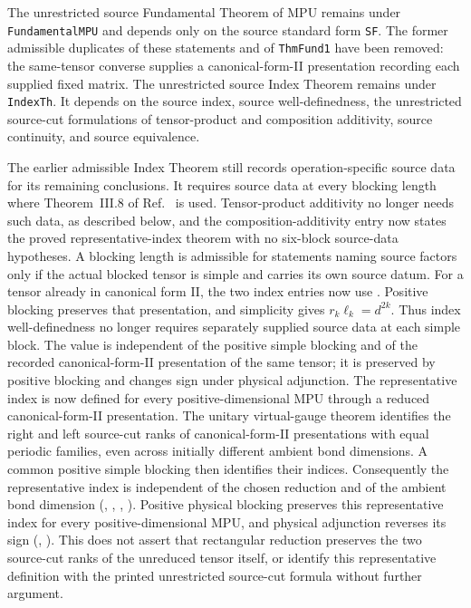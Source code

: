 \documentclass{article}
\begin{document}
The unrestricted source Fundamental Theorem of MPU remains under
\texttt{FundamentalMPU} and depends only on the source standard form
\texttt{SF}. The former admissible duplicates of these statements and of
\texttt{ThmFund1} have been removed: the same-tensor converse supplies a
canonical-form-II presentation recording each supplied fixed matrix.
The unrestricted source Index Theorem remains under
\texttt{IndexTh}. It depends on the source index, source well-definedness,
the unrestricted source-cut formulations of tensor-product and composition
additivity, source continuity, and
source equivalence.

The earlier admissible Index Theorem still records operation-specific source
data for its remaining conclusions. It requires source data at every blocking
length where Theorem~III.8 of Ref.~\cite{Cirac2017MPU} is used. Tensor-product
additivity no longer needs such data, as described below, and the
composition-additivity entry now states the proved representative-index
theorem with no six-block source-data hypotheses. A blocking length is
admissible for statements naming source factors only if the actual blocked
tensor is simple and carries its own source datum.
For a tensor already in canonical form II, the two index entries now use
. Positive blocking preserves
that presentation, and simplicity gives $r_k\ell_k=d^{2k}$. Thus index
well-definedness no longer requires separately supplied source data at each
simple block. The value is independent of the positive simple blocking and
of the recorded canonical-form-II presentation of the same tensor; it is
preserved by positive blocking and changes sign under physical adjunction.
The representative index is now defined for every positive-dimensional MPU
through a reduced canonical-form-II presentation. The unitary virtual-gauge
theorem identifies the right and left source-cut ranks of canonical-form-II
presentations with equal periodic families, even across initially different
ambient bond dimensions. A common positive simple blocking then identifies
their indices. Consequently the representative index is independent of the
chosen reduction and of the ambient bond dimension
(,
,
,
). Positive physical blocking
preserves this representative index for every positive-dimensional MPU, and
physical adjunction reverses its sign
(,
). This does not assert that
rectangular reduction preserves the two source-cut ranks of the unreduced
tensor itself, or identify this representative definition with the printed
unrestricted source-cut formula without further argument.
\end{document}
